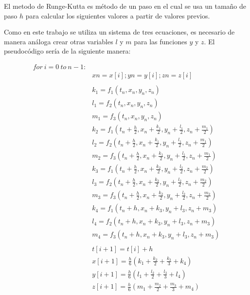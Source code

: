 \documentclass{wscpaperproc}
\theoremstyle{wsc}
\begin{document}
El metodo de Runge-Kutta es método de un paso en el cual se usa un tamaño de paso $h$ para calcular
los siguientes valores a partir de valores previos.

Como en este trabajo se utiliza un sistema de tres ecuaciones,
es necesario de manera análoga crear otras variables $l$ y $m$ para
las funciones $y$ y $z$. El pseudocódigo sería de la siguiente manera:


\doublespacing
\begin{equation*}
	\begin{split}
		for\ i=0\ to\ n - 1:\\
		&xn = x[i];yn = y[i];zn = z[i]\\
		\\
		&k_1 = f_1(t_n, x_n, y_n, z_n)\\
		&l_1 = f_2(t_n, x_n, y_n, z_n)\\
		&m_1 = f_3(t_n, x_n, y_n, z_n)\\
		&k_2 = f_1(t_n + \frac{h}{2}, x_n + \frac{k_1}{2}, y_n + \frac{l_1}{2}, z_n + \frac{m_1}{2})\\
		&l_2 = f_2(t_n + \frac{h}{2}, x_n + \frac{k_1}{2}, y_n + \frac{l_1}{2}, z_n + \frac{m_1}{2})\\
		&m_2 = f_3(t_n + \frac{h}{2}, x_n + \frac{k_1}{2}, y_n + \frac{l_1}{2}, z_n + \frac{m_1}{2})\\
		&k_3 = f_1(t_n + \frac{h}{2}, x_n + \frac{k_2}{2}, y_n + \frac{l_2}{2}, z_n + \frac{m_2}{2})\\
		&l_3 = f_2(t_n + \frac{h}{2}, x_n + \frac{k_2}{2}, y_n + \frac{l_2}{2}, z_n + \frac{m_2}{2})\\
		&m_3 = f_3(t_n + \frac{h}{2}, x_n + \frac{k_2}{2}, y_n + \frac{l_2}{2}, z_n + \frac{m_2}{2})\\
		&k_4 = f_1(t_n + h, x_n + k_3, y_n + l_3, z_n + m_3)\\
		&l_4 = f_2(t_n + h, x_n + k_3, y_n + l_3, z_n + m_3)\\
		&m_4 = f_3(t_n + h, x_n + k_3, y_n + l_3, z_n + m_3)\\
		\\
		&t[i+1] = t[i] + h\\
		&x[i+1] = \frac{h}{6}(k_1 + \frac{k_2}{2} + \frac{k_3}{3} + k_4)\\
		&y[i+1] = \frac{h}{6}(l_1 + \frac{l_2}{2} + \frac{l_3}{3} + l_4)\\
		&z[i+1] = \frac{h}{6}(m_1 + \frac{m_2}{2} + \frac{m_3}{3} + m_4)\\
	\end{split}
\end{equation*}
\singlespacing
\end{document}

